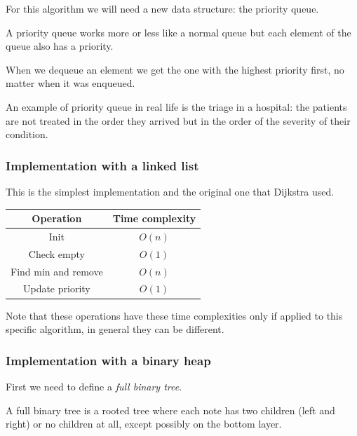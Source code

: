 \documentclass[10pt]{extarticle}
\begin{document}
For this algorithm we will need a new data structure: the priority queue.

A priority queue works more or less like a normal queue but each element of the queue also has a priority.

When we dequeue an element we get the one with the highest priority first, no matter when it was enqueued.

An example of priority queue in real life is the triage in a hospital: the patients are not treated in the order they arrived but in the order of the severity of their condition.

\subsubsection{Implementation with a linked list}

This is the simplest implementation and the original one that Dijkstra used.

\begin{center}
    \begin{tabular}{|c|c|}
        \hline
        \textbf{Operation}  & \textbf{Time complexity} \\
        \hline
        Init                & $O(n)$                   \\
        Check empty         & $O(1)$                   \\
        Find min and remove & $O(n)$                   \\
        Update priority     & $O(1)$                   \\
        \hline
    \end{tabular}
    \label{tab:priorityqueue_linkedlist}
\end{center}

Note that these operations have these time complexities only if applied to this specific algorithm, in general they can be different.

\subsubsection{Implementation with a binary heap}

First we need to define a \textit{full binary tree}.

A full binary tree is a rooted tree where each note has two children (left and right) or no children at all, except possibly on the bottom layer.
\end{document}
